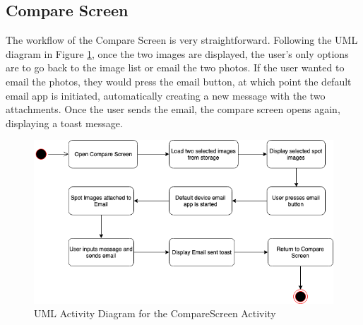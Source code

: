 \subsection{Compare Screen}
The workflow of the Compare Screen is very straightforward. Following the UML diagram in Figure \ref{fig:CompareScreen}, once the two images are displayed, the user's only options are to go back to the image list or email the two photos. If the user wanted to email the photos, they would press the email button, at which point the default email app is initiated, automatically creating a new message with the two attachments. Once the user sends the email, the compare screen opens again, displaying a toast message.

\begin{figure}
    \includegraphics[width=1.2\textwidth, center]{figures/CompareScreen.png}
    \caption{UML Activity Diagram for the CompareScreen Activity}
    \label{fig:CompareScreen}
\end{figure}


